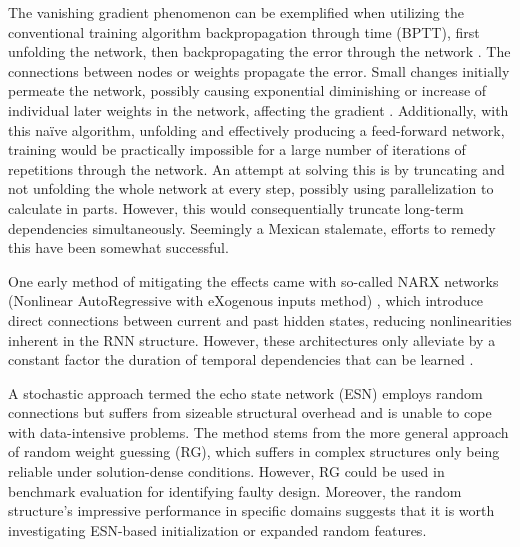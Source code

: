 The vanishing gradient phenomenon can be exemplified when utilizing the conventional training algorithm backpropagation through time (BPTT), first unfolding the network, then backpropagating the error through the network \cite{DRNNS}. The connections between nodes or weights propagate the error. Small changes initially permeate the network, possibly causing exponential diminishing or increase of individual later weights in the network, affecting the gradient \cite{field}. Additionally, with this naïve algorithm, unfolding and effectively producing a feed-forward network, training would be practically impossible for a large number of iterations of repetitions through the network. An attempt at solving this is by truncating and not unfolding the whole network at every step, possibly using parallelization to calculate in parts. However, this would consequentially truncate long-term dependencies simultaneously. Seemingly a Mexican stalemate, efforts to remedy this have been somewhat successful. 

One early method of mitigating the effects came with so-called NARX networks (Nonlinear AutoRegressive with eXogenous inputs method) \cite{DRNNS}, which introduce direct connections between current and past hidden states, reducing nonlinearities inherent in the RNN structure. However, these architectures only alleviate by a constant factor the duration of temporal dependencies that can be learned \cite{suts}.

A stochastic approach termed the echo state network (ESN) employs random connections but suffers from sizeable structural overhead and is unable to cope with data-intensive problems. The method stems from the more general approach of random weight guessing (RG), which suffers in complex structures only being reliable under solution-dense conditions. However, RG could be used in benchmark evaluation for identifying faulty design. Moreover, the random structure's impressive performance in specific domains suggests that it is worth investigating ESN-based initialization \cite{suts} or expanded random features. 

